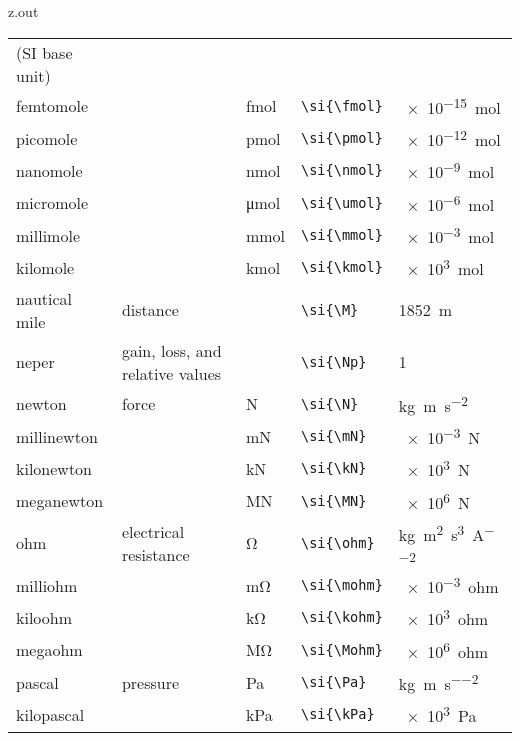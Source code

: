 \begin{VerbatimOut}{z.out}
{\begin{longtable}{@{}P{1.4in}P{1in}llP{1.8in}@{}}
      (SI base unit)\\
    \quad femtomole&
      \ditto&
      \si{\fmol}&
      \verb+\si{\fmol}+&
      \SI{e-15}{\mol}\\
    \quad picomole&
      \ditto&
      \si{\pmol}&
      \verb+\si{\pmol}+&
      \SI{e-12}{\mol}\\
    \quad nanomole&
      \ditto&
      \si{\nmol}&
      \verb+\si{\nmol}+&
      \SI{e-9}{\mol}\\
    \quad micromole&
      \ditto&
      \si{\umol}&
      \verb+\si{\umol}+&
      \SI{e-6}{\mol}\\
    \quad millimole&
      \ditto&
      \si{\mmol}&
      \verb+\si{\mmol}+&
      \SI{e-3}{\mol}\\
    \quad kilomole&
      \ditto&
      \si{\kmol}&
      \verb+\si{\kmol}+&
      \SI{e3}{\mol}\\
    \vsp
    nautical mile&
      distance&
      \si{\M}&
      \verb+\si{\M}+&
      \SI{1852}{\m}\\
    \vsp
    neper&
      gain, loss, and relative values&
      \si{\Np}&
      \verb+\si{\Np}+&
      1\\
    \vsp
    newton&
      force&
      \si{\N}&
      \verb+\si{\N}+&
      \si{\kg\m\per\s\squared}\\
    \quad millinewton&
      \ditto&
      \si{\mN}&
      \verb+\si{\mN}+&
      \SI{e-3}{\N}\\
    \quad kilonewton&
      \ditto&
      \si{\kN}&
      \verb+\si{\kN}+&
      \SI{e3}{\N}\\
    \quad meganewton&
      \ditto&
      \si{\MN}&
      \verb+\si{\MN}+&
      \SI{e6}{\N}\\
    \vsp
    ohm&
      electrical resistance&
      \si{\ohm}&
      \verb+\si{\ohm}+&
      \si{\kg\m\squared\per\s\cubed\per\A\squared}\\
    \quad milliohm&
      \ditto&
      \si{\mohm}&
      \verb+\si{\mohm}+&
      \SI{e-3}{ohm}\\
    \quad kiloohm&
      \ditto&
      \si{\kohm}&
      \verb+\si{\kohm}+&
      \SI{e3}{ohm}\\
    \quad megaohm&
      \ditto&
      \si{\Mohm}&
      \verb+\si{\Mohm}+&
      \SI{e6}{ohm}\\
    \vsp
    pascal&
      pressure&
      \si{\Pa}&
      \verb+\si{\Pa}+&
      \si{\kg\per\m\per\s\squared}\\
    \qquad kilopascal&
      \ditto&
      \si{\kPa}&
      \verb+\si{\kPa}+&
      \SI{e3}{\Pa}\\

\end{longtable}}
\end{VerbatimOut}
